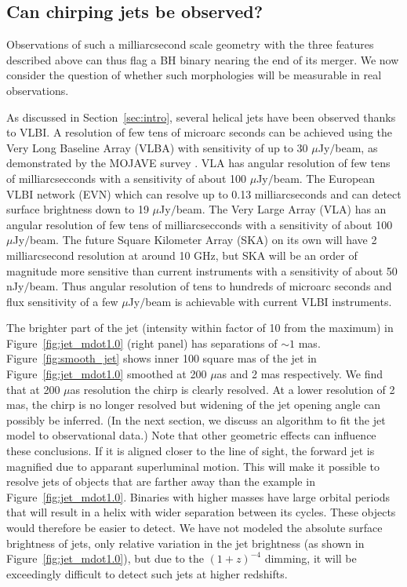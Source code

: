 \documentclass[a4paper,fleqn,usenatbib]{mnras}
\begin{document}
\subsection{Can chirping jets be observed?}

Observations of such a milliarcsecond scale geometry with the three
features described above can thus flag a BH binary nearing the end of
its merger.  We now consider the question of whether such morphologies
will be measurable in real observations.

As discussed in Section~\ref{sec:intro}, several helical jets have
been observed thanks to VLBI.  A resolution of few tens of microarc
seconds can be achieved using the Very Long Baseline Array (VLBA) with
sensitivity of up to 30 $\mu$Jy$/$beam, as demonstrated by the MOJAVE
survey \citep{2009AJ....138.1874L}.  VLA has angular resolution of few
tens of milliarcsecconds with a sensitivity of about 100
$\mu$Jy$/$beam.  The European VLBI network (EVN) which can resolve up
to 0.13 milliarcseconds and can detect surface brightness down to 19
$\mu$Jy$/$beam.  The Very Large Array (VLA) has an angular resolution
of few tens of milliarcsecconds with a sensitivity of about 100
$\mu$Jy$/$beam.  The future Square Kilometer Array (SKA) on its own
will have 2 milliarcsecond resolution at around 10 GHz, but SKA will
be an order of magnitude more sensitive than current instruments with
a sensitivity of about 50 nJy$/$beam.  Thus angular resolution of tens
to hundreds of microarc seconds and flux sensitivity of a few
$\mu$Jy$/$beam is achievable with current VLBI instruments.

The brighter part of the jet (intensity within factor of 10 from the
maximum) in Figure~\ref{fig:jet_mdot1.0} (right panel) has separations
of $\sim 1$ mas.  Figure~\ref{fig:smooth_jet} shows inner 100 square
mas of the jet in Figure~\ref{fig:jet_mdot1.0} smoothed at 200 $\mu$as
and 2 mas respectively.  We find that at 200 $\mu$as resolution the
chirp is clearly resolved.  At a lower resolution of 2 mas, the chirp
is no longer resolved but widening of the jet opening angle can
possibly be inferred.  (In the next section, we discuss an algorithm
to fit the jet model to observational data.)  Note that other
geometric effects can influence these conclusions.  If it is aligned
closer to the line of sight, the forward jet is magnified due to
apparant superluminal motion.  This will make it possible to resolve
jets of objects that are farther away than the example in
Figure~\ref{fig:jet_mdot1.0}.  Binaries with higher masses have large
orbital periods that will result in a helix with wider separation
between its cycles.  These objects would therefore be easier to
detect.  We have not modeled the absolute surface brightness of jets,
only relative variation in the jet brightness (as shown in
Figure~\ref{fig:jet_mdot1.0}), but due to the $(1+z)^{-4}$ dimming, it
will be exceedingly difficult to detect such jets at higher redshifts.
\end{document}
